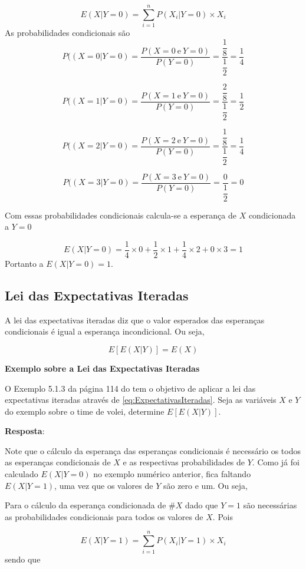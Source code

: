 \documentclass[
]{book}
\begin{document}
\[
  E(X|Y=0) = \sum_{i=1}^{n} P(X_i|Y=0) \times X_i
\]
As probabilidades condicionais são
\[
  P((X=0|Y=0) = \dfrac{P(X=0~\text{e}~Y=0)}{P(Y=0)}= \dfrac{\dfrac{1}{8}}{\dfrac{1}{2}}= \dfrac{1}{4}
\]

\[
  P((X=1|Y=0) = \dfrac{P(X=1~\text{e}~Y=0)}{P(Y=0)}= \dfrac{\dfrac{2}{8}}{\dfrac{1}{2}}= \dfrac{1}{2}
\]

\[
  P((X=2|Y=0) = \dfrac{P(X=2~\text{e}~Y=0)}{P(Y=0)}= \dfrac{\dfrac{1}{8}}{\dfrac{1}{2}}= \dfrac{1}{4}
\]

\[
  P((X=3|Y=0) = \dfrac{P(X=3~\text{e}~Y=0)}{P(Y=0)}= \dfrac{0}{\dfrac{1}{2}}= 0
\]

Com essas probabilidades condicionais calcula-se a esperança de \(X\) condicionada a \(Y=0\)

\[
  E(X|Y=0) = \frac{1}{4}\times 0 + \frac{1}{2} \times 1 + \frac{1}{4}\times 2 + 0 \times 3 = 1
\]
Portanto a \(E(X|Y=0) = 1\).

\hypertarget{lei-das-expectativas-iteradas}{%
\subsection{Lei das Expectativas Iteradas}\label{lei-das-expectativas-iteradas}}

A lei das expectativas iteradas diz que o valor esperados das esperanças condicionais é igual a esperança incondicional. Ou seja,

\[
  E[E(X|Y)] = E(X)
  \label{eq:ExpectativasIteradas}
\]

\textbf{Exemplo sobre a Lei das Expectativas Iteradas}

O Exemplo 5.1.3 da página 114 do \citet{Sartoris2013} tem o objetivo de aplicar a lei das expectativas iteradas através de \eqref{eq:ExpectativasIteradas}. Seja as variáveis \(X\) e \(Y\) do exemplo sobre o time de volei, determine \(E[E(X|Y)]\).

\textbf{Resposta}:

Note que o cálculo da esperança das esperanças condicionais é necessário os todos as esperanças condicionais de \(X\) e as respectivas probabilidades de \(Y\). Como já foi calculado \(E(X|Y=0)\) no exemplo numérico anterior, fica faltando \(E(X|Y=1)\), uma vez que os valores de \(Y\) são zero e um. Ou seja,

Para o cálculo da esperança condicionada de \#\(X\) dado que \(Y=1\) são necessárias as probabilidades condicionais para todos os valores de \(X\). Pois

\[
  E(X|Y=1) = \sum_{i=1}^{n} P(X_i|Y=1) \times X_i
\]
sendo que
\end{document}
